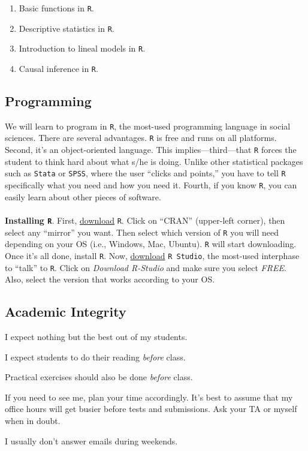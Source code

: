 \documentclass[letterpaper]{article}
\renewenvironment{itemize}{
  \begin{list}{}{
    \setlength{\leftmargin}{1.5em}
  }
}{
  \end{list}
}
\begin{document}
\begin{enumerate}
	\item Basic functions in \texttt{R}.
	\item Descriptive statistics in \texttt{R}.
	\item Introduction to lineal models in \texttt{R}.
 	\item Causal inference in \texttt{R}.
\end{enumerate}


\subsection*{Programming}

We will learn to program in \texttt{R}, the most-used programming language in social sciences. There are several advantages. \texttt{R} is free and runs on all platforms. Second, it's an object-oriented language. This implies---third---that \texttt{R} forces the student to think hard about what s/he is doing. Unlike other statistical packages such as \texttt{Stata} or \texttt{SPSS}, where the user ``clicks and points,'' you have to tell \texttt{R} specifically what you need and how you need it. Fourth, if you know \texttt{R}, you can easily learn about other pieces of software.
\\
\\
{\bf Installing \texttt{R}}. First, \href{https://www.r-project.org/}{download} \texttt{R}. Click on ``CRAN'' (upper-left corner), then select any ``mirror'' you want. Then select which version of \texttt{R} you will need depending on your OS (i.e., Windows, Mac, Ubuntu). \texttt{R} will start downloading. Once it's all done, install \texttt{R}. Now, \href{https://www.rstudio.com}{download} \texttt{R Studio}, the most-used interphase to ``talk'' to \texttt{R}. Click on \emph{Download R-Studio} and make sure you select \emph{FREE}. Also, select the version that works according to your OS.


\subsection*{Academic Integrity}

I expect nothing but the best out of my students. 

\begin{itemize}
     \item[$\circ$] I expect students to do their reading \emph{before} class.
     \item[$\circ$] Practical exercises should also be done \emph{before} class. 
     \item[$\circ$] If you need to see me, plan your time accordingly. It's best to assume that my office hours will get busier before tests and submissions. Ask your TA or myself when in doubt. 

  \item[$\circ$] I usually don't answer emails during weekends. 
\end{itemize}
\end{document}
